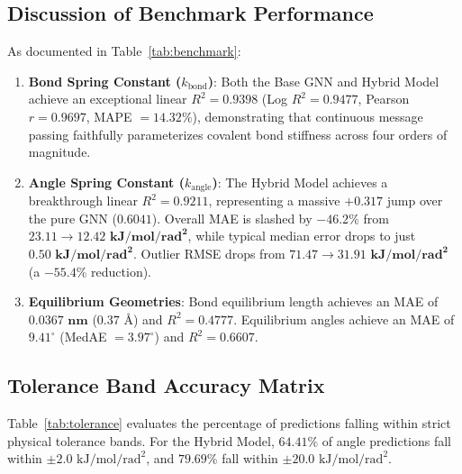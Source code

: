 \documentclass[10pt,journal,compsoc]{IEEEtran}
\begin{document}
\subsection{Discussion of Benchmark Performance}
As documented in Table~\ref{tab:benchmark}:
\begin{enumerate}
    \item \textbf{Bond Spring Constant ($k_{\text{bond}}$)}: Both the Base GNN and Hybrid Model achieve an exceptional linear $R^2 = \mathbf{0.9398}$ (Log $R^2 = \mathbf{0.9477}$, Pearson $r = \mathbf{0.9697}$, MAPE $= 14.32\%$), demonstrating that continuous message passing faithfully parameterizes covalent bond stiffness across four orders of magnitude.
    \item \textbf{Angle Spring Constant ($k_{\text{angle}}$)}: The Hybrid Model achieves a breakthrough linear $R^2 = \mathbf{0.9211}$, representing a massive $\mathbf{+0.317}$ jump over the pure GNN ($0.6041$). Overall MAE is slashed by $\mathbf{-46.2\%}$ from $23.11 \to \mathbf{12.42\text{ kJ/mol/rad}^2}$, while typical median error drops to just $\mathbf{0.50\text{ kJ/mol/rad}^2}$. Outlier RMSE drops from $71.47 \to \mathbf{31.91\text{ kJ/mol/rad}^2}$ (a $\mathbf{-55.4\%}$ reduction).
    \item \textbf{Equilibrium Geometries}: Bond equilibrium length achieves an MAE of $\mathbf{0.0367\text{ nm}}$ ($0.37\text{ \AA}$) and $R^2 = 0.4777$. Equilibrium angles achieve an MAE of $\mathbf{9.41^\circ}$ (MedAE $= 3.97^\circ$) and $R^2 = 0.6607$.
\end{enumerate}

\subsection{Tolerance Band Accuracy Matrix}
Table~\ref{tab:tolerance} evaluates the percentage of predictions falling within strict physical tolerance bands. For the Hybrid Model, $\mathbf{64.41\%}$ of angle predictions fall within $\pm 2.0\text{ kJ/mol/rad}^2$, and $\mathbf{79.69\%}$ fall within $\pm 20.0\text{ kJ/mol/rad}^2$.
\end{document}
